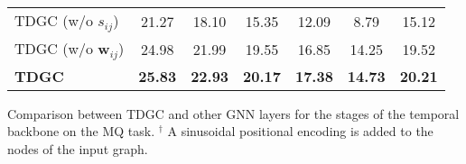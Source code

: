 \begin{table}[tb]
\begin{tabularx}{1.0\columnwidth}{X|ccccc|c@{}}
        \midrule
        TDGC (w/o $s_{ij}$)                   & 21.27                                  & 18.10             & 15.35             & 12.09             & 8.79                             & 15.12             \\
        TDGC (w/o $\mathbf{w}_{ij}$)          & 24.98                                  & 21.99             & 19.55             & 16.85             & 14.25                            & 19.52             \\
        \textbf{TDGC}                         & \textbf{25.83}                         & \textbf{22.93}    & \textbf{20.17}    & \textbf{17.38}    & \textbf{14.73}                   & \textbf{20.21}    \\
        \bottomrule
    \end{tabularx}
    \begin{tablenotes}[flushleft]
        \scriptsize
        \item \noindent Comparison between TDGC and other GNN layers for the stages of the temporal backbone on the MQ task.
        $^\dagger$ A sinusoidal positional encoding is added to the nodes of the input graph.
    \end{tablenotes}
\end{table}